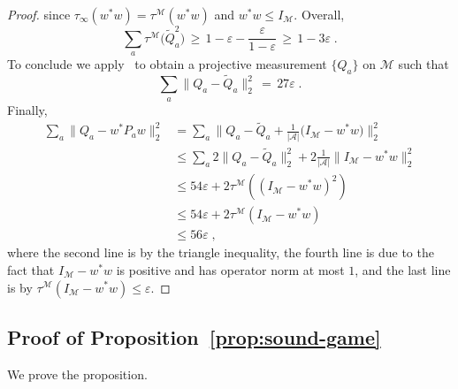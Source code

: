 \documentclass[11pt]{article}
\theoremstyle{definition}
\newcommand{\mA}{\ensuremath{\mathcal{A}}}
\newcommand{\mM}{\ensuremath{\mathcal{M}}}
\newcommand{\eps}{\varepsilon}
\begin{document}
\begin{proof}
since $\tau_\infty(w^* w) = \tau^\mM(w^* w)$ and $w^*w\leq I_\mM$. Overall, 
\[ \sum_a \tau^\mM \big( \tilde{Q}_a^2 \big) \,\geq\, 1-\eps-\frac{\eps}{1-\eps}\,\geq\, 1-3\eps\;.\]
To conclude we apply~\cite[Theorem 1.2]{de2021orthogonalization} to obtain a projective measurement $\{Q_a\}$ on $\mM$ such that 
\begin{equation*}
\sum_a \big\|{Q}_a - \tilde{Q}_a \big\|^2_2 \,=\, 27\eps\;.
\end{equation*}
Finally,
\begin{align*}
\sum_a \big\|{Q}_a - w^*{P}_a w\big\|^2_2 &= \sum_a \Big\|{Q}_a - \tilde{Q}_a  + \frac{1}{|\mA|}\big(I_\mM - w^* w\big) \Big\|^2_2\\
&\leq  \sum_a 2\big\|{Q}_a - \tilde{Q}_a\big\|_2^2  + 2\frac{1}{|\mA|}\big\|I_\mM - w^* w\big\|_2^2 \\
&\leq 54 \eps + 2 \tau^\mM( (I_\mM - w^* w)^2 ) \\
&\leq 54 \eps + 2 \tau^\mM(I_\mM - w^* w ) \\
&\leq 56 \eps\;,
\end{align*}
where the second line is by the triangle inequality, the fourth line is due to the fact that $I_\mM - w^* w$ is positive and has operator norm at most $1$, and the last line is by $\tau^\mM(I_\mM - w^* w ) \leq \eps$.
\end{proof}




\subsection{Proof of Proposition~\ref{prop:sound-game}}
\label{sec:game-proof}

We prove the proposition. 
\end{document}
